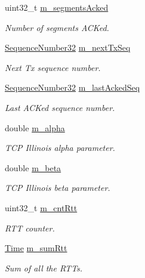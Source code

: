 \begin{DoxyCompactItemize}
uint32\+\_\+t \hyperlink{classTcpIllinoisTest_afa357d8f8c5c3d2d2c63c72d76d6c3a9}{m\+\_\+segments\+Acked}
\begin{DoxyCompactList}\small\item\em Number of segments A\+C\+Ked. \end{DoxyCompactList}\item 
\hyperlink{group__network_gacb2070e4e98d2d5135c9bede58f07a03}{Sequence\+Number32} \hyperlink{classTcpIllinoisTest_a4dc91af5ef7f4fb09603dd130d8d3fdb}{m\+\_\+next\+Tx\+Seq}
\begin{DoxyCompactList}\small\item\em Next Tx sequence number. \end{DoxyCompactList}\item 
\hyperlink{group__network_gacb2070e4e98d2d5135c9bede58f07a03}{Sequence\+Number32} \hyperlink{classTcpIllinoisTest_a28a9d0a4a206927f6bcbf168b8e98033}{m\+\_\+last\+Acked\+Seq}
\begin{DoxyCompactList}\small\item\em Last A\+C\+Ked sequence number. \end{DoxyCompactList}\item 
double \hyperlink{classTcpIllinoisTest_ad2a9a93f32ddcb3183cdb1168435e82d}{m\+\_\+alpha}
\begin{DoxyCompactList}\small\item\em T\+CP Illinois alpha parameter. \end{DoxyCompactList}\item 
double \hyperlink{classTcpIllinoisTest_ade2dbf31d984e382cf76a2403b79e46e}{m\+\_\+beta}
\begin{DoxyCompactList}\small\item\em T\+CP Illinois beta parameter. \end{DoxyCompactList}\item 
uint32\+\_\+t \hyperlink{classTcpIllinoisTest_a90c562721676a1bd3fb50c12d54fe726}{m\+\_\+cnt\+Rtt}
\begin{DoxyCompactList}\small\item\em R\+TT counter. \end{DoxyCompactList}\item 
\hyperlink{classns3_1_1Time}{Time} \hyperlink{classTcpIllinoisTest_ab05f6b6fa96ddefb75396ebc6a2015de}{m\+\_\+sum\+Rtt}
\begin{DoxyCompactList}\small\item\em Sum of all the R\+T\+Ts. \end{DoxyCompactList}\item 

\end{DoxyCompactItemize}
